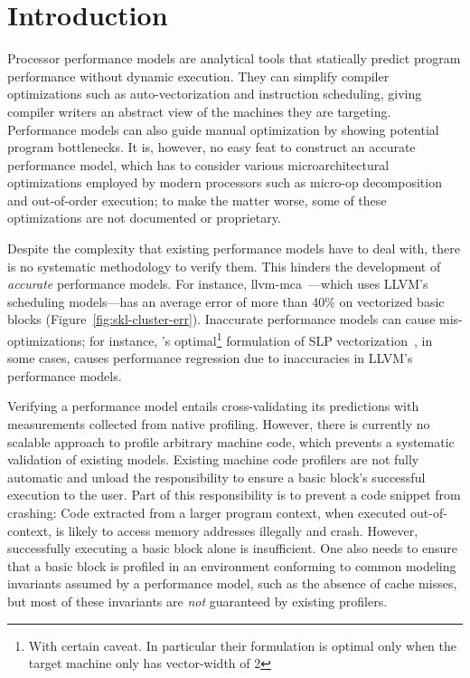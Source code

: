 \section{Introduction}
Processor performance models are analytical tools that statically predict
program performance without dynamic execution.
They can simplify compiler optimizations such as
auto-vectorization and instruction scheduling,
giving compiler writers an abstract view of the machines they are targeting.
Performance models can also guide manual optimization by showing
potential program bottlenecks.
It is, however, no easy feat to construct an accurate performance model,
which has to consider various microarchitectural optimizations employed by
modern processors such as micro-op decomposition and out-of-order execution;
to make the matter worse, some of these optimizations 
are not documented or proprietary.

Despite the complexity that existing performance models have to deal with,
there is no systematic methodology to verify them. 
This hinders the development of \emph{accurate} performance models.
For instance, llvm-mca~\cite{llvm-mca}---which uses 
LLVM's scheduling models---has an average error of more than 40\% on vectorized
basic blocks (Figure~\ref{fig:skl-cluster-err}).
Inaccurate performance models can cause mis-optimizations;
for instance, \cite{goslp}'s optimal\footnote{
With certain caveat.
In particular their formulation is optimal only when the target machine only has vector-width of 2} 
formulation of SLP vectorization~\cite{slp},
in some cases, causes performance regression due to inaccuracies in LLVM's~\cite{llvm} performance models.


Verifying a performance model
entails cross-validating its predictions with
measurements collected
from native profiling.
However, there is currently no scalable approach 
to profile arbitrary machine code, which 
prevents a systematic validation of existing models.
Existing machine code profilers are not fully automatic and
unload the responsibility to ensure a basic block's successful
execution to the user.
Part of this responsibility is to prevent a code snippet from crashing: 
Code extracted from a larger program context, when executed
out-of-context, is likely to access memory addresses illegally and crash.
However, successfully executing a basic block alone is insufficient.
One also needs to ensure that a basic block 
is profiled in an environment
conforming to common modeling invariants
assumed by a performance model,
such as the absence of cache misses,
but most of these invariants are \textit{not}
guaranteed by existing profilers.


